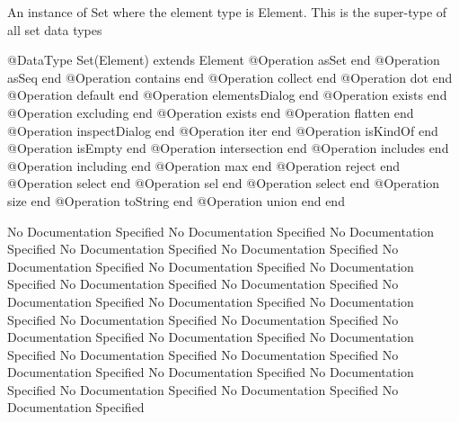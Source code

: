       An instance of Set where the element type is Element. This is the super-type 
      of all set data types
\begin{Interface}
@DataType Set(Element) extends Element
  @Operation asSet end
  @Operation asSeq end
  @Operation contains end
  @Operation collect end
  @Operation dot end
  @Operation default end
  @Operation elementsDialog end
  @Operation exists end
  @Operation excluding end
  @Operation exists end
  @Operation flatten end
  @Operation inspectDialog end
  @Operation iter end
  @Operation isKindOf end
  @Operation isEmpty end
  @Operation intersection end
  @Operation includes end
  @Operation including end
  @Operation max end
  @Operation reject end
  @Operation select end
  @Operation sel end
  @Operation select end
  @Operation size end
  @Operation toString end
  @Operation union end
end
\end{Interface}
No Documentation Specified
No Documentation Specified
No Documentation Specified
No Documentation Specified
No Documentation Specified
No Documentation Specified
No Documentation Specified
No Documentation Specified
No Documentation Specified
No Documentation Specified
No Documentation Specified
No Documentation Specified
No Documentation Specified
No Documentation Specified
No Documentation Specified
No Documentation Specified
No Documentation Specified
No Documentation Specified
No Documentation Specified
No Documentation Specified
No Documentation Specified
No Documentation Specified
No Documentation Specified
No Documentation Specified
No Documentation Specified
No Documentation Specified

